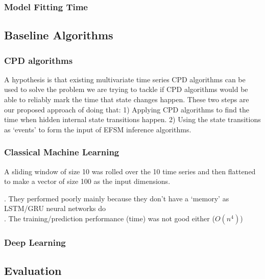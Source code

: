 \subsubsection{Model Fitting Time}




\subsection{Baseline Algorithms}
\subsubsection{CPD algorithms}
A hypothesis is that existing multivariate time series CPD algorithms can be used to solve the problem we are trying to tackle if CPD algorithms would be able to reliably mark the time that state changes happen.
These two steps are our proposed approach of doing that:
1) Applying CPD algorithms to find the time when hidden internal state transitions happen. 
2) Using the state transitions as `events' to form the input of EFSM inference algorithms.

\subsubsection{Classical Machine Learning}
A sliding window of size 10 was rolled over the 10 time series and then flattened to make a vector of size 100 as the input dimensions.


. They performed poorly mainly because they don't have a `memory' as LSTM/GRU neural networks do\\
. The training/prediction performance (time) was not good either ($O(n^4)$)\\


\subsubsection{Deep Learning}

\subsection{Evaluation}


